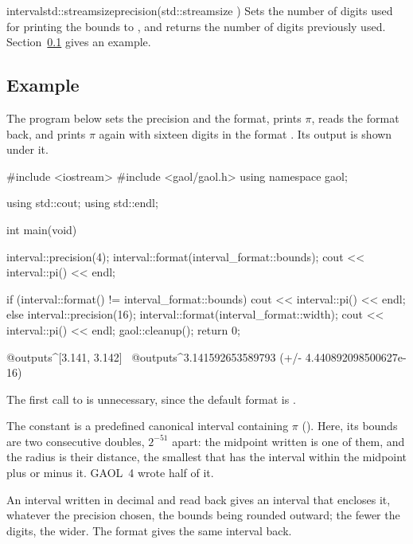 \documentclass[12pt,a4paper,twoside,openright]{book}
\begin{document}
\begin{defstaticmethod}{interval}{std::streamsize}{precision}{(std::streamsize )}
  Sets the number of digits used for printing the bounds to , and
  returns the number of digits previously used.
  Section~\ref{sec:output-example} gives an example.
\end{defstaticmethod}

\subsection{Example}\label{sec:output-example}

\begin{Ex}
The program below sets the precision and the format, prints $\pi$, reads
the format back, and prints $\pi$ again with sixteen digits in the format
. Its output is shown under it.
\begin{example}
#include <iostream>
#include <gaol/gaol.h>
using namespace gaol;

using std::cout;
using std::endl;

int main(void)
{
  interval::precision(4);
  interval::format(interval_format::bounds);
  cout << interval::pi() << endl;

  if (interval::format() != interval_format::bounds) {
    cout << interval::pi() << endl;
  } else {
    interval::precision(16);
    interval::format(interval_format::width);
    cout << interval::pi() << endl;
  }
  gaol::cleanup();
  return 0;
}
@outputs^[3.141, 3.142]~
@outputs^3.141592653589793 (+/- 4.440892098500627e-16)~
\end{example}
\end{Ex}

\noindent
The first call to  is unnecessary, since the
default format is .

The constant  is a predefined canonical interval
containing $\pi$ (). Here, its bounds are two
consecutive doubles, $2^{-51}$ apart: the midpoint written is one of them,
and the radius is their distance, the smallest that has the interval within
the midpoint plus or minus it.\newinvfive{} GAOL~4 wrote half of it.

\begin{Rem}
An interval written in decimal and read back gives an interval that
encloses it, whatever the precision chosen, the bounds being rounded
outward; the fewer the digits, the wider. The format  gives
the same interval back.
\end{Rem}
\end{document}
